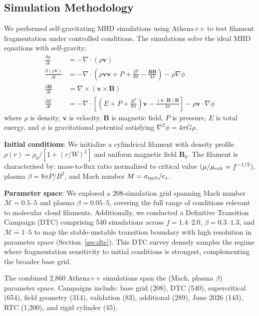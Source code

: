 \documentclass[twocolumn,longtitle,usenatbib]{mnras}
\begin{document}
\subsection{Simulation Methodology}

We performed self-gravitating MHD simulations using Athena++ \citep{Stone2020} to test filament fragmentation under controlled conditions. The simulations solve the ideal MHD equations with self-gravity:
\begin{align}
\frac{\partial \rho}{\partial t} &= -\nabla \cdot (\rho \mathbf{v}) \\
\frac{\partial (\rho \mathbf{v})}{\partial t} &= -\nabla \cdot \left(\rho \mathbf{v} \mathbf{v} + P + \frac{B^2}{8\pi} - \frac{\mathbf{B}\mathbf{B}}{4\pi}\right) - \rho \nabla \phi \\
\frac{\partial \mathbf{B}}{\partial t} &= \nabla \times (\mathbf{v} \times \mathbf{B}) \\
\frac{\partial E}{\partial t} &= -\nabla \cdot \left[(E + P + \frac{B^2}{8\pi})\mathbf{v} - \frac{(\mathbf{v} \cdot \mathbf{B})\mathbf{B}}{4\pi}\right] - \rho \mathbf{v} \cdot \nabla \phi
\end{align}
where $\rho$ is density, $\mathbf{v}$ is velocity, $\mathbf{B}$ is magnetic field, $P$ is pressure, $E$ is total energy, and $\phi$ is gravitational potential satisfying $\nabla^2 \phi = 4\pi G\rho$.

\textbf{Initial conditions}: We initialize a cylindrical filament with density profile $\rho(r) = \rho_0 / [1 + (r/W)^2]$ and uniform magnetic field $\mathbf{B}_0$. The filament is characterised by: mass-to-flux ratio normalized to critical value ($\mu/\mu_{\rm crit} = f^{-1/2}$), plasma $\beta = 8\pi P/B^2$, and Mach number $M = \sigma_{\rm turb}/c_s$.

\textbf{Parameter space}: We explored a 208-simulation grid spanning Mach number $\mathcal{M} = 0.5$--$5$ and plasma $\beta = 0.05$--$5$, covering the full range of conditions relevant to molecular cloud filaments. Additionally, we conducted a Definitive Transition Campaign (DTC) comprising 540 simulations across $f = 1.4$--$2.0$, $\beta = 0.3$--$1.3$, and $\mathcal{M} = 1$--$5$ to map the stable-unstable transition boundary with high resolution in parameter space (Section~\ref{sec:dtc}). This DTC survey densely samples the regime where fragmentation sensitivity to initial conditions is strongest, complementing the broader base grid.

The combined 2,860 Athena++ simulations span the (Mach, plasma $\beta$) parameter space. Campaigns include: base grid (208), DTC (540), supercritical (654), field geometry (314), validation (83), additional (289), June 2026 (143), RTC (1,200), and rigid cylinder (45).
\end{document}
